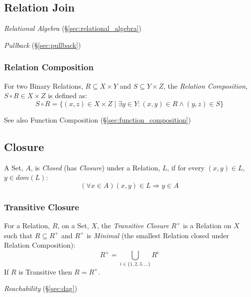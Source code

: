 \subsection{Relation Join}\label{sec:relation_join}

\emph{Relational Algebra} (\S\ref{sec:relational_algebra})

\emph{Pullback} (\S\ref{sec:pullback})



\subsubsection{Relation Composition}\label{sec:relation_composition}

For two Binary Relations, $R \subseteq X \times Y$ and $S \subseteq Y
\times Z$, the \emph{Relation Composition}, $S \circ R \in X \times Z$
is defined as:
\[
  S \circ R = \{(x,z) \in X \times Z \;|\;
  \exists y \in Y : (x,y) \in R \wedge (y,z) \in S \}
\]

See also Function Composition (\S\ref{sec:function_composition})



\subsection{Closure}\label{sec:set_closure}

A Set, $A$, is \emph{Closed} (has \emph{Closure}) under a Relation,
$L$, if for every $(x,y) \in L$, $y \in dom(L)$:
\[
  (\forall x \in A) (x,y) \in L \Rightarrow y \in A
\]



\subsubsection{Transitive Closure}\label{sec:transitive_closure}

For a Relation, $R$, on a Set, $X$, the \emph{Transitive Closure}
$R^+$ is a Relation on $X$ such that $R \subseteq R^+$ and $R^+$ is
\emph{Minimal} (the smallest Relation closed under Relation
Composition):
\[
  R^+ = \bigcup_{i \in \{1,2,3,...\}} R^i
\]
If $R$ is Transitive then $R = R^+$.

\emph{Reachability} (\S\ref{sec:dag})



